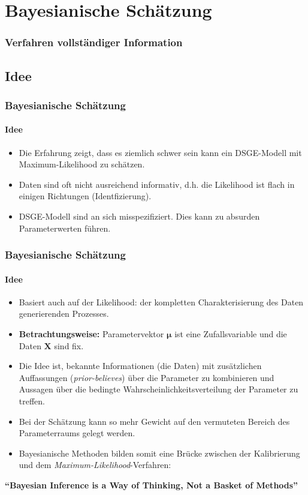 \documentclass{beamer} %
\begin{document}
\section{Bayesianische Sch\"{a}tzung}
\begin{frame}\frametitle{Verfahren vollst\"{a}ndiger Information}
  \tableofcontents[currentsection]
\end{frame}

\subsection{Idee}
\begin{frame}\frametitle{Bayesianische Sch\"{a}tzung}\framesubtitle{Idee}
\begin{itemize}
  \item Die Erfahrung zeigt, dass es ziemlich schwer sein kann ein DSGE-Modell mit Maximum-Likelihood zu schätzen.
  \item Daten sind oft nicht ausreichend informativ, d.h. die Likelihood ist flach in einigen Richtungen (Identfizierung).
  \item DSGE-Modell sind an sich misspezifiziert. Dies kann zu absurden Parameterwerten führen.
\end{itemize}
\end{frame}

\begin{frame}\frametitle{Bayesianische Sch\"{a}tzung}\framesubtitle{Idee}
\begin{itemize}
  \item Basiert auch auf der Likelihood: der kompletten Charakterisierung des Daten generierenden Prozesses.
  \item \textbf{Betrachtungsweise:} Parametervektor $\boldsymbol{\mu}$ ist eine Zufallsvariable und die Daten $\mathbf{X}$ sind fix.
  \item Die Idee ist, bekannte Informationen (die Daten) mit zus\"{a}tzlichen Auffassungen (\emph{prior-believes}) \"{u}ber die Parameter zu kombinieren und Aussagen \"{u}ber die bedingte Wahrscheinlichkeitsverteilung der Parameter zu treffen.
  \item Bei der Sch\"{a}tzung kann so mehr Gewicht auf den vermuteten Bereich des Parameterraums gelegt werden.
  \item Bayesianische Methoden bilden somit eine Br\"{u}cke zwischen der Kalibrierung und dem \emph{Maximum-Likelihood}-Verfahren:
\end{itemize}
\textbf{\enquote{Bayesian Inference is a Way of Thinking, Not a Basket of Methods}}
\end{frame}
\end{document}
